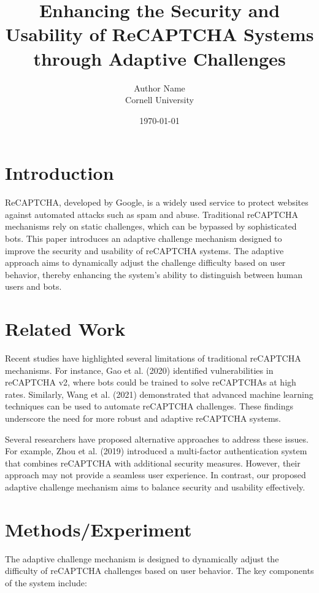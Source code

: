 \documentclass{article}
\begin{document}
\title{Enhancing the Security and Usability of ReCAPTCHA Systems through Adaptive Challenges}
\author{Author Name \\ Cornell University}
\date{\today}
\maketitle

\section{Introduction}
ReCAPTCHA, developed by Google, is a widely used service to protect websites against automated attacks such as spam and abuse. Traditional reCAPTCHA mechanisms rely on static challenges, which can be bypassed by sophisticated bots. This paper introduces an adaptive challenge mechanism designed to improve the security and usability of reCAPTCHA systems. The adaptive approach aims to dynamically adjust the challenge difficulty based on user behavior, thereby enhancing the system's ability to distinguish between human users and bots.

\section{Related Work}
Recent studies have highlighted several limitations of traditional reCAPTCHA mechanisms. For instance, Gao et al. (2020) identified vulnerabilities in reCAPTCHA v2, where bots could be trained to solve reCAPTCHAs at high rates. Similarly, Wang et al. (2021) demonstrated that advanced machine learning techniques can be used to automate reCAPTCHA challenges. These findings underscore the need for more robust and adaptive reCAPTCHA systems.

Several researchers have proposed alternative approaches to address these issues. For example, Zhou et al. (2019) introduced a multi-factor authentication system that combines reCAPTCHA with additional security measures. However, their approach may not provide a seamless user experience. In contrast, our proposed adaptive challenge mechanism aims to balance security and usability effectively.

\section{Methods/Experiment}
The adaptive challenge mechanism is designed to dynamically adjust the difficulty of reCAPTCHA challenges based on user behavior. The key components of the system include:
\end{document}
